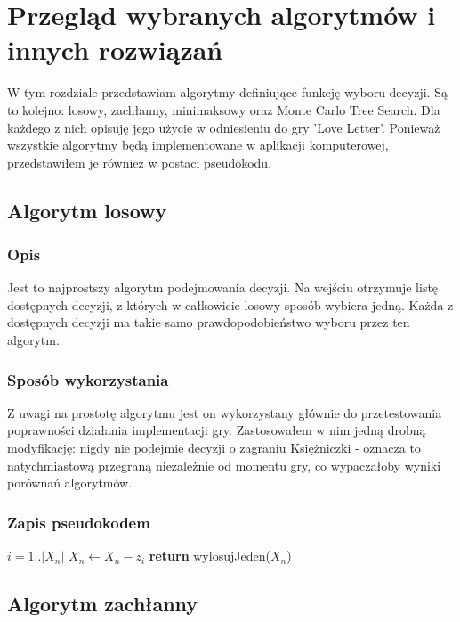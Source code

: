 \chapter{Przegląd wybranych algorytmów i innych rozwiązań}
\label{cha:rozdz3}

W tym rozdziale przedstawiam algorytmy definiujące funkcję wyboru decyzji. Są to kolejno: losowy, zachłanny, minimaksowy oraz Monte Carlo Tree Search. Dla każdego z nich opisuję jego użycie w odniesieniu do gry 'Love Letter'. Ponieważ wszystkie algorytmy będą implementowane w aplikacji komputerowej, przedstawiłem je również w postaci pseudokodu.

\section{Algorytm losowy}
\label{sec:algLos}
\subsection{Opis}
Jest to najprostszy algorytm podejmowania decyzji. Na wejściu otrzymuje listę dostępnych decyzji, z których w całkowicie losowy sposób wybiera jedną. Każda z dostępnych decyzji ma takie samo prawdopodobieństwo wyboru przez ten algorytm.

\subsection{Sposób wykorzystania}
Z uwagi na prostotę algorytmu jest on wykorzystany głównie do przetestowania poprawności działania implementacji gry. Zastosowałem w nim jedną drobną modyfikację: nigdy nie podejmie decyzji o zagraniu Księżniczki - oznacza to natychmiastową przegraną niezależnie od momentu gry, co wypaczałoby wyniki porównań algorytmów.

\subsection{Zapis pseudokodem}
\begin{algorithmic}[1]
		 \Comment $i =1..|X_n|$
				\State $X_n \gets X_n - z_i$
			\EndIf
		\EndFor
	\State \textbf{return} wylosujJeden($X_n$) 
	\EndFunction
\end{algorithmic}

\section{Algorytm zachłanny}
\label{sec:algZach}
